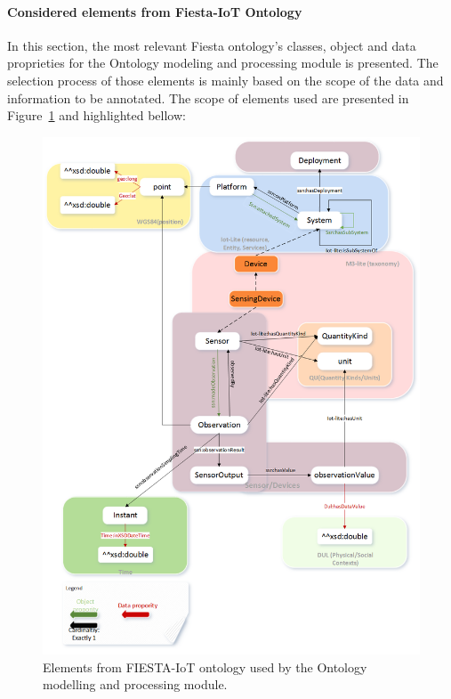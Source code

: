 \paragraph{Considered elements from Fiesta-IoT Ontology }
\label{sec:contrib2:ele}
In this section, the most relevant Fiesta ontology's classes, object and data proprieties for the Ontology modeling and processing module is presented. The selection process of those elements is mainly based on the scope of the data and information to be annotated. The scope of elements used are presented in Figure~\ref{fig:contrib2:fiesta} and highlighted bellow:
\begin{figure}[htbp]
    \centering
    \includegraphics[width=1\textwidth]{resources/images/fiesta}
    \caption{Elements from FIESTA-IoT ontology used by the Ontology modelling and processing module. }\label{fig:contrib2:fiesta}
\end{figure}
